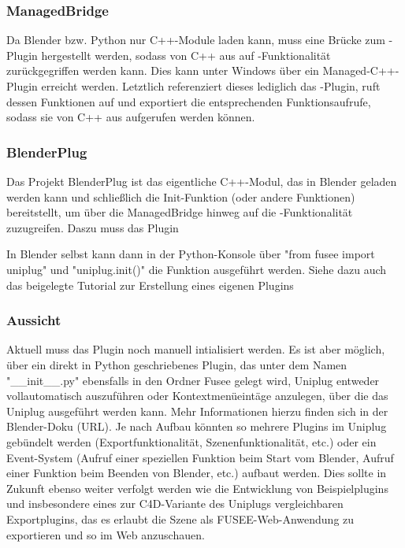 \subsubsection{ManagedBridge}

Da Blender bzw. Python nur C++-Module laden kann, muss eine Brücke zum \CS{}-Plugin hergestellt werden, sodass von C++ aus auf \CS{}-Funktionalität zurückgegriffen werden kann. Dies kann unter Windows über ein Managed-C++-Plugin erreicht werden. Letztlich referenziert dieses lediglich das \CS{}-Plugin, ruft dessen Funktionen auf und exportiert die entsprechenden Funktionsaufrufe, sodass sie von C++ aus aufgerufen werden können.

\subsubsection{BlenderPlug}

Das Projekt BlenderPlug ist das eigentliche C++-Modul, das in Blender geladen werden kann und schließlich die Init-Funktion (oder andere Funktionen) bereitstellt, um über die ManagedBridge hinweg auf die \CS{}-Funktionalität zuzugreifen.  Daszu muss das Plugin 

In Blender selbst kann dann in der Python-Konsole über "from fusee import uniplug" und "uniplug.init()" die Funktion ausgeführt werden. Siehe dazu auch das beigelegte Tutorial zur Erstellung eines eigenen Plugins

\subsubsection{Aussicht}

Aktuell muss das Plugin noch manuell intialisiert werden. Es ist aber möglich, über ein direkt in Python geschriebenes Plugin, das unter dem Namen "\_\_init\_\_.py" ebensfalls in den Ordner Fusee gelegt wird, Uniplug entweder vollautomatisch auszuführen oder Kontextmenüeintäge anzulegen, über die das Uniplug ausgeführt werden kann. Mehr Informationen hierzu finden sich in der Blender-Doku (URL). Je nach Aufbau könnten so mehrere Plugins im Uniplug gebündelt werden (Exportfunktionalität, Szenenfunktionalität, etc.) oder ein Event-System (Aufruf einer speziellen Funktion beim Start vom Blender, Aufruf einer Funktion beim Beenden von Blender, etc.) aufbaut werden. Dies sollte in Zukunft ebenso weiter verfolgt werden wie die Entwicklung von Beispielplugins und insbesondere eines zur C4D-Variante des Uniplugs vergleichbaren Exportplugins, das es erlaubt die Szene als FUSEE-Web-Anwendung zu exportieren und so im Web anzuschauen.


